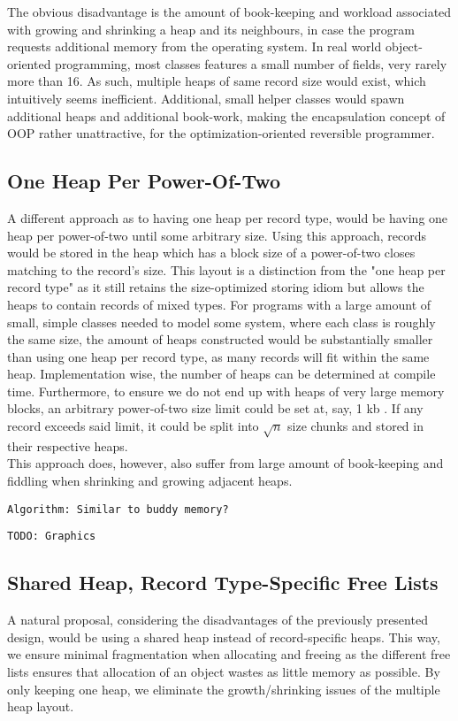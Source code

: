 The obvious disadvantage is the amount of book-keeping and workload associated with growing and shrinking a heap and its neighbours, in case the program requests additional memory from the operating system. In real world object-oriented programming, most classes features a small number of fields, very rarely more than 16. As such, multiple heaps of same record size would exist, which intuitively seems inefficient. Additional, small helper classes would spawn additional heaps and additional book-work, making the encapsulation concept of OOP rather unattractive, for the optimization-oriented reversible programmer.



\subsection{One Heap Per Power-Of-Two}
A different approach as to having one heap per record type, would be having one heap per power-of-two until some arbitrary size. Using this approach, records would be stored in the heap which has a block size of a power-of-two closes matching to the record's size. This layout is a distinction from the "one heap per record type" as it still retains the size-optimized storing idiom but allows the heaps to contain records of mixed types. For programs with a large amount of small, simple classes needed to model some system, where each class is roughly the same size, the amount of heaps constructed would be substantially smaller than using one heap per record type, as many records will fit within the same heap. Implementation wise, the number of heaps can be determined at compile time. Furthermore, to ensure we do not end up with heaps of very large memory blocks, an arbitrary power-of-two size limit could be set at, say, 1 kb . If any record exceeds said limit, it could be split into $\sqrt{n}$ size chunks and stored in their respective heaps.\\
This approach does, however, also suffer from large amount of book-keeping and fiddling when shrinking and growing adjacent heaps.

\texttt{Algorithm: Similar to buddy memory?}

\texttt{TODO: Graphics}

\subsection{Shared Heap, Record Type-Specific Free Lists}
A natural proposal, considering the disadvantages of the previously presented design, would be using a shared heap instead of record-specific heaps. 
This way, we ensure minimal fragmentation when allocating and freeing as the different free lists ensures that allocation of an object wastes as little memory as possible. By only keeping one heap, we eliminate the growth/shrinking issues of the multiple heap layout. 

